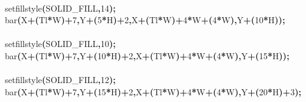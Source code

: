\documentclass[a4paper, 10pt]{article}
\newcommand\SPC{\hspace*{0.6em}}
\newcommand{\CppAIdentifier}[1]{#1}
\newcommand{\CppANumber}[1]{\textcolor[rgb]{0.5,0,0.5}{#1}}
\newcommand{\CppASpace}[1]{\colorbox[rgb]{1,1,1}{#1}}
\newcommand{\CppASymbol}[1]{\textbf{\textcolor[rgb]{1,0,0}{#1}}}
\begin{document}
\begin{ttfamily}
\\
\CppASpace{\SPC \SPC \SPC \SPC \SPC \SPC \SPC }\CppAIdentifier{setfillstyle}\CppASymbol{(}\CppAIdentifier{SOLID\_FILL}\CppASymbol{,}\CppANumber{14}\CppASymbol{)}\CppASymbol{;}\\
\CppASpace{\SPC \SPC \SPC \SPC \SPC \SPC \SPC }\CppAIdentifier{bar}\CppASymbol{(}\CppAIdentifier{X}\CppASymbol{+}\CppASymbol{(}\CppAIdentifier{Tl}\CppASymbol{*}\CppAIdentifier{W}\CppASymbol{)}\CppASymbol{+}\CppANumber{7}\CppASymbol{,}\CppAIdentifier{Y}\CppASymbol{+}\CppASymbol{(}\CppANumber{5}\CppASymbol{*}\CppAIdentifier{H}\CppASymbol{)}\CppASymbol{+}\CppANumber{2}\CppASymbol{,}\CppAIdentifier{X}\CppASymbol{+}\CppASymbol{(}\CppAIdentifier{Tl}\CppASymbol{*}\CppAIdentifier{W}\CppASymbol{)}\CppASymbol{+}\CppANumber{4}\CppASymbol{*}\CppAIdentifier{W}\CppASymbol{+}\CppASymbol{(}\CppANumber{4}\CppASymbol{*}\CppAIdentifier{W}\CppASymbol{)}\CppASymbol{,}\CppAIdentifier{Y}\CppASymbol{+}\CppASymbol{(}\CppANumber{10}\CppASymbol{*}\CppAIdentifier{H}\CppASymbol{)}\CppASymbol{)}\CppASymbol{;}\\
\\
\CppASpace{\SPC \SPC \SPC \SPC \SPC \SPC \SPC }\CppAIdentifier{setfillstyle}\CppASymbol{(}\CppAIdentifier{SOLID\_FILL}\CppASymbol{,}\CppANumber{10}\CppASymbol{)}\CppASymbol{;}\\
\CppASpace{\SPC \SPC \SPC \SPC \SPC \SPC \SPC }\CppAIdentifier{bar}\CppASymbol{(}\CppAIdentifier{X}\CppASymbol{+}\CppASymbol{(}\CppAIdentifier{Tl}\CppASymbol{*}\CppAIdentifier{W}\CppASymbol{)}\CppASymbol{+}\CppANumber{7}\CppASymbol{,}\CppAIdentifier{Y}\CppASymbol{+}\CppASymbol{(}\CppANumber{10}\CppASymbol{*}\CppAIdentifier{H}\CppASymbol{)}\CppASymbol{+}\CppANumber{2}\CppASymbol{,}\CppAIdentifier{X}\CppASymbol{+}\CppASymbol{(}\CppAIdentifier{Tl}\CppASymbol{*}\CppAIdentifier{W}\CppASymbol{)}\CppASymbol{+}\CppANumber{4}\CppASymbol{*}\CppAIdentifier{W}\CppASymbol{+}\CppASymbol{(}\CppANumber{4}\CppASymbol{*}\CppAIdentifier{W}\CppASymbol{)}\CppASymbol{,}\CppAIdentifier{Y}\CppASymbol{+}\CppASymbol{(}\CppANumber{15}\CppASymbol{*}\CppAIdentifier{H}\CppASymbol{)}\CppASymbol{)}\CppASymbol{;}\\
\\
\CppASpace{\SPC \SPC \SPC \SPC \SPC \SPC \SPC }\CppAIdentifier{setfillstyle}\CppASymbol{(}\CppAIdentifier{SOLID\_FILL}\CppASymbol{,}\CppANumber{12}\CppASymbol{)}\CppASymbol{;}\\
\CppASpace{\SPC \SPC \SPC \SPC \SPC \SPC \SPC }\CppAIdentifier{bar}\CppASymbol{(}\CppAIdentifier{X}\CppASymbol{+}\CppASymbol{(}\CppAIdentifier{Tl}\CppASymbol{*}\CppAIdentifier{W}\CppASymbol{)}\CppASymbol{+}\CppANumber{7}\CppASymbol{,}\CppAIdentifier{Y}\CppASymbol{+}\CppASymbol{(}\CppANumber{15}\CppASymbol{*}\CppAIdentifier{H}\CppASymbol{)}\CppASymbol{+}\CppANumber{2}\CppASymbol{,}\CppAIdentifier{X}\CppASymbol{+}\CppASymbol{(}\CppAIdentifier{Tl}\CppASymbol{*}\CppAIdentifier{W}\CppASymbol{)}\CppASymbol{+}\CppANumber{4}\CppASymbol{*}\CppAIdentifier{W}\CppASymbol{+}\CppASymbol{(}\CppANumber{4}\CppASymbol{*}\CppAIdentifier{W}\CppASymbol{)}\CppASymbol{,}\CppAIdentifier{Y}\CppASymbol{+}\CppASymbol{(}\CppANumber{20}\CppASymbol{*}\CppAIdentifier{H}\CppASymbol{)}\CppASymbol{+}\CppANumber{3}\CppASymbol{)}\CppASymbol{;}\\

\end{ttfamily}
\end{document}
